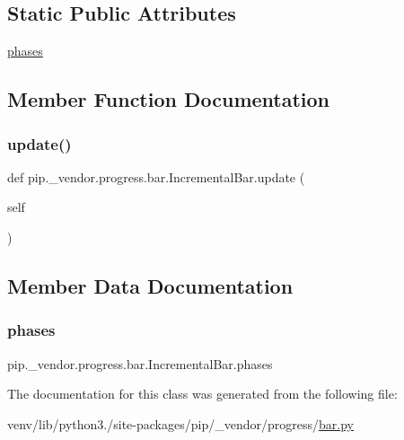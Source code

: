 \subsection*{Static Public Attributes}
\begin{DoxyCompactItemize}
\item 
\hyperlink{classpip_1_1__vendor_1_1progress_1_1bar_1_1IncrementalBar_a621eac31f3decf53fe88fbe9d533bd63}{phases}
\end{DoxyCompactItemize}


\subsection{Member Function Documentation}
\mbox{\label{classpip_1_1__vendor_1_1progress_1_1bar_1_1IncrementalBar_a6e0eb6d866a1f8904d51d3d2a7e60bf0}} 
\subsubsection{\texorpdfstring{update()}{update()}}
{\footnotesize\ttfamily def pip.\+\_\+vendor.\+progress.\+bar.\+Incremental\+Bar.\+update (\begin{DoxyParamCaption}\item[{}]{self }\end{DoxyParamCaption})}



\subsection{Member Data Documentation}
\mbox{\label{classpip_1_1__vendor_1_1progress_1_1bar_1_1IncrementalBar_a621eac31f3decf53fe88fbe9d533bd63}} 
\subsubsection{\texorpdfstring{phases}{phases}}
{\footnotesize\ttfamily pip.\+\_\+vendor.\+progress.\+bar.\+Incremental\+Bar.\+phases\hspace{0.3cm}{\ttfamily [static]}}



The documentation for this class was generated from the following file\+:\begin{DoxyCompactItemize}
\item 
venv/lib/python3./site-\/packages/pip/\+\_\+vendor/progress/\hyperlink{bar_8py}{bar.\+py}\end{DoxyCompactItemize}
